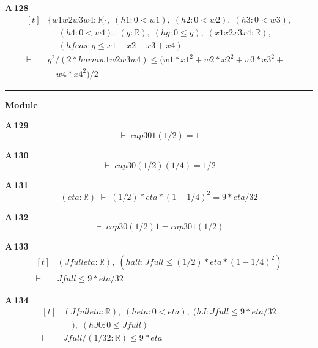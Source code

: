 \noindent\textbf{A\,128}\quad{}
{\footnotesize\[ \begin{aligned}[t]
&\{ \mathit{w1} \mathit{w2} \mathit{w3} \mathit{w4} : \mathbb{R} \},\; (\mathit{h1} : 0 < \mathit{w1}),\; (\mathit{h2} : 0 < \mathit{w2}),\; (\mathit{h3} : 0 < \mathit{w3}),\\
&\quad \; (\mathit{h4} : 0 < \mathit{w4}),\; (\mathit{g} : \mathbb{R} ),\; (\mathit{hg} : 0 \leq \mathit{g}),\; (\mathit{x1} \mathit{x2} \mathit{x3} \mathit{x4} : \mathbb{R} ),\\
&\quad \; (\mathit{hfeas} : \mathit{g} \leq \mathit{x1} - \mathit{x2} - \mathit{x3} + \mathit{x4})\\
\vdash\;&\mathit{g} ^{2} / (2 * \mathit{harm} \mathit{w1} \mathit{w2} \mathit{w3} \mathit{w4}) \leq (\mathit{w1}*\mathit{x1}^{2} + \mathit{w2}*\mathit{x2}^{2} + \mathit{w3}*\mathit{x3}^{2} +\\
&\quad \mathit{w4}*\mathit{x4}^{2}) / 2
\end{aligned} \]}

\vspace{4pt}\noindent\rule{\columnwidth}{0.4pt}\par\vspace{2pt}
\noindent\textbf{Module }\par\vspace{3pt}

\noindent\textbf{A\,129}\quad{}
{\footnotesize\[ \vdash\; \mathit{cap3} 0 1 (1/2) = 1 \]}

\noindent\textbf{A\,130}\quad{}
{\footnotesize\[ \vdash\; \mathit{cap3} 0 (1/2) (1/4) = 1/2 \]}

\noindent\textbf{A\,131}\quad{}
{\footnotesize\[ (\mathit{eta} : \mathbb{R} ) \;\vdash\; (1/2) * \mathit{eta} * (1 - 1/4) ^{2} = 9 * \mathit{eta} / 32 \]}

\noindent\textbf{A\,132}\quad{}
{\footnotesize\[ \vdash\; \mathit{cap3} 0 (1/2) 1 = \mathit{cap3} 0 1 (1/2) \]}

\noindent\textbf{A\,133}\quad{}
{\footnotesize\[ \begin{aligned}[t]
&(\mathit{Jfull} \mathit{eta} : \mathbb{R} ),\; (\mathit{halt} : \mathit{Jfull} \leq (1/2) * \mathit{eta} * (1 - 1/4) ^{2})\\
\vdash\;&\mathit{Jfull} \leq 9 * \mathit{eta} / 32
\end{aligned} \]}

\noindent\textbf{A\,134}\quad{}
{\footnotesize\[ \begin{aligned}[t]
&(\mathit{Jfull} \mathit{eta} : \mathbb{R} ),\; (\mathit{heta} : 0 < \mathit{eta}),\; (\mathit{hJ} : \mathit{Jfull} \leq 9 * \mathit{eta} / 32\\
&\quad ),\; (\mathit{hJ0} : 0 \leq \mathit{Jfull})\\
\vdash\;&\mathit{Jfull} / (1 / 32 : \mathbb{R} ) \leq 9 * \mathit{eta}
\end{aligned} \]}

